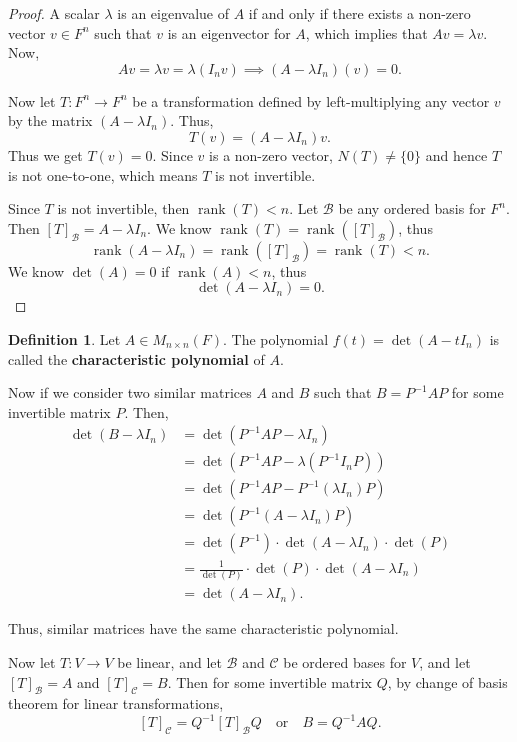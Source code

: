 \documentclass[12pt, a4paper]{article}
\theoremstyle{definition}
\newtheorem{definition}{Definition}[section]
\theoremstyle{remark}
\newcommand{\B}{\mathscr{B}}
\DeclareMathOperator{\rank}{rank}
\begin{document}
\begin{proof}
A scalar $\lambda$ is an eigenvalue of $A$ if and only if there exists a non-zero vector $v \in F^n$ such that $v$ is an eigenvector for $A$, which implies that $A v = \lambda v$. Now,
\[
A v = \lambda v = \lambda (I_n v) \implies (A - \lambda I_n)(v) = 0.
\]

Now let $T : F^n \to F^n$ be a transformation defined by left-multiplying any vector $v$ by the matrix $(A - \lambda I_n)$. Thus,
\[
T(v) = (A - \lambda I_n) v.
\]
Thus we get $T(v) = 0$. Since $v$ is a non-zero vector, $N(T) \neq \{0\}$ and hence $T$ is not one-to-one, which means $T$ is not invertible.

Since $T$ is not invertible, then $\rank(T) < n$. Let $\B$ be any ordered basis for $F^n$. Then $[T]_\B = A - \lambda I_n$. We know $\rank(T)=\rank([T]_\B)$, thus
\[
\rank(A - \lambda I_n) = \rank([T]_\B) = \rank(T) < n.
\]
We know $\det(A)=0$ if $\rank(A)<n$, thus
\[
\det(A - \lambda I_n) = 0.
\]
\end{proof}

\begin{definition}
Let $A \in M_{n \times n}(F)$. The polynomial $f(t) = \det(A - t I_n)$ is called the \textbf{characteristic polynomial} of $A$.
\end{definition}

Now if we consider two similar matrices $A$ and $B$ such that $B = P^{-1} A P$ for some invertible matrix $P$. Then,
\begin{align*}
\det(B - \lambda I_n) &= \det(P^{-1} A P - \lambda I_n) \\
&= \det\left(P^{-1} A P - \lambda (P^{-1} I_n P)\right) \\
&= \det\left(P^{-1} A P - P^{-1} (\lambda I_n) P\right) \\
&= \det\left(P^{-1}(A - \lambda I_n) P\right) \\
&= \det(P^{-1}) \cdot \det(A - \lambda I_n) \cdot \det(P) \\
&= \frac{1}{\det(P)} \cdot \det(P) \cdot \det(A - \lambda I_n) \\
&= \det(A - \lambda I_n).
\end{align*}

Thus, similar matrices have the same characteristic polynomial.

Now let $T: V \to V$ be linear, and let $\B$ and $\mathscr{C}$ be ordered bases for $V$, and let $[T]_\B = A$ and $[T]_{\mathscr{C}} = B$. Then for some invertible matrix $Q$, by change of basis theorem for linear transformations,
\[
[T]_{\mathscr{C}} = Q^{-1} [T]_\B Q \quad \text{or} \quad B = Q^{-1} A Q.
\]
\end{document}
